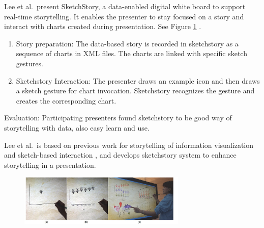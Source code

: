 \documentclass{egpubl}
\begin{document}
%
Lee et al.\ present SketchStory, a data-enabled digital white board to support real-time storytelling. It enables the presenter to stay focused on a story and interact with charts created during presentation. See Figure \ref{fig:lee2013} \cite{lee2013}.
\begin{enumerate}
\item Story preparation: The data-based story is recorded in sketchstory as a sequence of charts in XML files. The charts are linked with specific sketch gestures.
\item Sketchstory Interaction: The presenter draws an example icon and then draws a sketch gesture for chart invocation. Sketchstory recognizes the gesture and creates the corresponding chart.
\end{enumerate}
Evaluation: Participating presenters found sketchstory to be good way of storytelling with data, also easy learn and use.

Lee et al.\ is based on previous work for storytelling of information visualization \cite{Gershon2,segal} and sketch-based interaction \cite{li2012}, and develops sketchstory system to enhance storytelling in a presentation.
\begin{figure}
\begingroup
\centering
\includegraphics[width=8cm]{./images/lee2013}
\label{fig:lee2013}
\endgroup
\end{figure}
\end{document}
